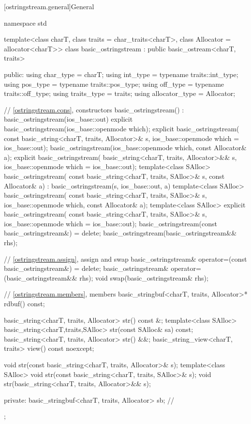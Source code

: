 [ostringstream.general]{General}

%
\begin{codeblock}
namespace std {
  template<class charT, class traits = char_traits<charT>,
           class Allocator = allocator<charT>>
  class basic_ostringstream : public basic_ostream<charT, traits> {
  public:
    using char_type      = charT;
    using int_type       = typename traits::int_type;
    using pos_type       = typename traits::pos_type;
    using off_type       = typename traits::off_type;
    using traits_type    = traits;
    using allocator_type = Allocator;

    // \ref{ostringstream.cons}, constructors
    basic_ostringstream() : basic_ostringstream(ios_base::out) {}
    explicit basic_ostringstream(ios_base::openmode which);
    explicit basic_ostringstream(
      const basic_string<charT, traits, Allocator>& s,
      ios_base::openmode which = ios_base::out);
    basic_ostringstream(ios_base::openmode which, const Allocator& a);
    explicit basic_ostringstream(
      basic_string<charT, traits, Allocator>&& s,
      ios_base::openmode which = ios_base::out);
    template<class SAlloc>
      basic_ostringstream(
        const basic_string<charT, traits, SAlloc>& s, const Allocator& a)
        : basic_ostringstream(s, ios_base::out, a) {}
    template<class SAlloc>
      basic_ostringstream(
        const basic_string<charT, traits, SAlloc>& s,
        ios_base::openmode which, const Allocator& a);
    template<class SAlloc>
      explicit basic_ostringstream(
        const basic_string<charT, traits, SAlloc>& s,
        ios_base::openmode which = ios_base::out);
    basic_ostringstream(const basic_ostringstream&) = delete;
    basic_ostringstream(basic_ostringstream&& rhs);

    // \ref{ostringstream.assign}, assign and swap
    basic_ostringstream& operator=(const basic_ostringstream&) = delete;
    basic_ostringstream& operator=(basic_ostringstream&& rhs);
    void swap(basic_ostringstream& rhs);

    // \ref{ostringstream.members}, members
    basic_stringbuf<charT, traits, Allocator>* rdbuf() const;

    basic_string<charT, traits, Allocator> str() const &;
    template<class SAlloc>
      basic_string<charT,traits,SAlloc> str(const SAlloc& sa) const;
    basic_string<charT, traits, Allocator> str() &&;
    basic_string_view<charT, traits> view() const noexcept;

    void str(const basic_string<charT, traits, Allocator>& s);
    template<class SAlloc>
      void str(const basic_string<charT, traits, SAlloc>& s);
    void str(basic_string<charT, traits, Allocator>&& s);

   private:
    basic_stringbuf<charT, traits, Allocator> sb;   // \expos
  };
}
\end{codeblock}

